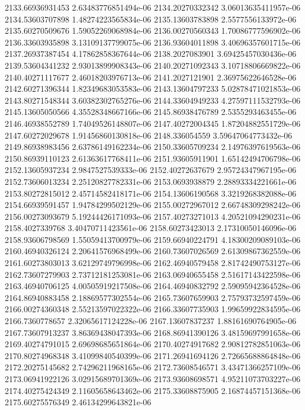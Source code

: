 {2133.66936931453 2.63483776851494e-06
2134.20270332342 3.06013635411957e-06
2134.53603707898 1.48274223565834e-06
2135.13603783898 2.5577556133972e-06
2135.60270509676 1.59052269068984e-06
2136.00270560343 1.70086777596902e-06
2136.33603935898 3.13109137799075e-06
2136.93604011898 3.40696357601715e-06
2137.26937387454 4.17862858367644e-06
2138.2027083901 3.69425457030436e-06
2139.53604341232 2.93013899908343e-06
2140.20271092343 3.10718806669822e-06
2140.40271117677 2.46018203976713e-06
2141.2027121901 2.36975622646528e-06
2142.60271396344 1.82349683053583e-06
2143.13604797233 5.02878471021853e-06
2143.80271548344 3.60382302765276e-06
2144.33604949233 4.27597111532793e-06
2145.13605050566 4.35528348667166e-06
2145.86938476789 2.5355293463455e-06
2146.46938552789 1.74049526148807e-06
2147.40272004345 1.87204882551729e-06
2147.60272029678 1.91456860130818e-06
2148.336054559 3.59647064773432e-06
2149.86938983456 2.63786149162234e-06
2150.33605709234 2.14976397619563e-06
2150.86939110123 2.61363617768411e-06
2151.93605911901 1.65142494706798e-06
2152.13605937234 2.9847527539333e-06
2152.40272637679 2.95724347967195e-06
2152.73606013234 2.25120827782331e-06
2153.0693938879 2.28893334221661e-06
2153.80272815012 2.45714582418171e-06
2154.13606190568 3.3219268382088e-06
2154.66939591457 1.94784299502129e-06
2155.00272967012 2.66748309298242e-06
2156.00273093679 5.19244426171093e-06
2157.40273271013 4.20521094290231e-06
2158.4027339768 3.40470711423561e-06
2158.60273423013 2.17310050146096e-06
2158.93606798569 1.55059413700979e-06
2159.66940224791 4.18300209089103e-06
2160.46940326124 2.20641576968499e-06
2160.73607026569 2.61309867362559e-06
2161.60273803013 3.62129749796998e-06
2162.46940579458 2.81742490753127e-06
2162.73607279903 2.73712181253081e-06
2163.06940655458 2.51617143422598e-06
2163.46940706125 4.00505919217508e-06
2164.46940832792 2.59095942364528e-06
2164.86940883458 2.18869577302554e-06
2165.73607659903 2.75793732597459e-06
2166.00274360348 2.55213597022322e-06
2166.33607735903 1.99659922834595e-06
2166.7360778657 2.32065617124228e-06
2167.13607837237 1.88161690764905e-06
2167.73607913237 3.86369438047393e-06
2168.86941390126 3.48159697991658e-06
2169.40274791015 2.69698685651864e-06
2170.40274917682 2.90812782851063e-06
2170.80274968348 3.41099840540399e-06
2171.26941694126 2.72665688864848e-06
2172.20275145682 2.74296211968165e-06
2172.73608546571 3.43471366257109e-06
2173.06941922126 3.02915689701369e-06
2173.93608698571 4.95211073703227e-06
2174.40275424349 2.11605658643462e-06
2175.33608875905 2.16874457151368e-06
2175.60275576349 2.46134299643821e-06
}
